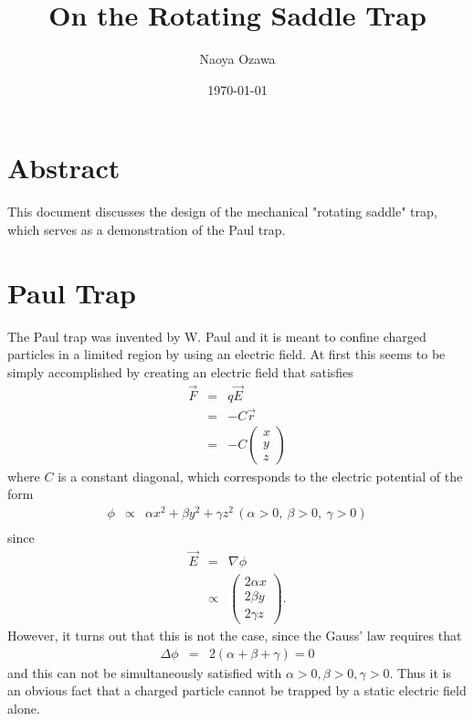 \documentclass{jarticle}
\title{On the Rotating Saddle Trap}
\author{Naoya Ozawa}
\date{\today}
\begin{document}
\maketitle

\section{Abstract}
This document discusses the design of the mechanical "rotating saddle" trap\cite{}, which serves as a demonstration of the Paul trap\cite{PaulNobel}.

\section{Paul Trap}
The Paul trap was invented by W. Paul and it is meant to confine charged particles in a limited region by using an electric field. At first this seems to be simply accomplished by creating an electric field that satisfies
\begin{eqnarray*}
\vec{F} & = & q \vec{E} \\
& = & -C \vec{r} \\
& = & -C \left(
\begin{array}{c}
	x \\
	y \\
	z
\end{array} \right)
\end{eqnarray*}
where $C$ is a constant diagonal, which corresponds to the electric potential of the form
\begin{eqnarray*}
\phi & \propto & \alpha x^2 + \beta y^2 + \gamma z^2 \, (\alpha>0,\ \beta>0,\ \gamma>0) \\
\end{eqnarray*}
since
\begin{eqnarray*}
\vec{E} & = & \nabla \phi \\
& \propto & \left(
\begin{array}{c}
	2\alpha x \\
	2\beta y \\
	2\gamma z
\end{array} \right).
\end{eqnarray*}
However, it turns out that this is not the case, since the Gauss' law requires that
\begin{eqnarray*}
\Delta \phi & = & 2 (\alpha + \beta + \gamma) = 0
\end{eqnarray*}
and this can not be simultaneously satisfied with $\alpha>0, \beta>0, \gamma>0$. Thus it is an obvious fact that a charged particle cannot be trapped by a static electric field alone. \\
\end{document}
